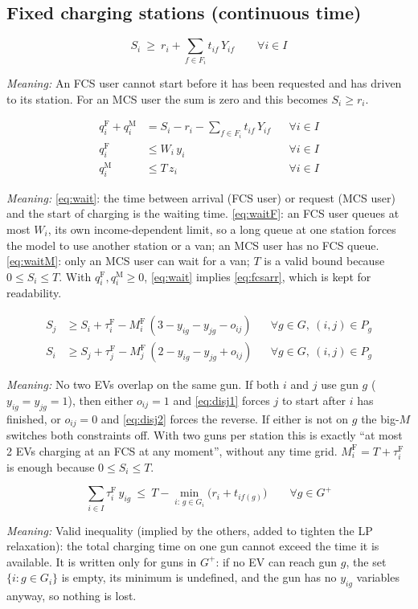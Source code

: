 \documentclass[12pt,a4paper]{article}
\newcommand{\mdesc}[1]{\par{\textit{Meaning:} #1}\par}
\begin{document}
\subsection{Fixed charging stations (continuous time)}
\begin{equation}
S_i\ \ge\ r_i+\sum_{f\in F_i}t_{if}\,Y_{if}\qquad\forall i\in I \label{eq:fcsarr}
\end{equation}
\mdesc{An FCS user cannot start before it has been requested and has driven to its station. For an MCS user the sum is zero and this becomes $S_i\ge r_i$.}

\begin{align}
q^{\mathrm F}_i+q^{\mathrm M}_i &= S_i-r_i-\sum_{f\in F_i}t_{if}\,Y_{if} && \forall i\in I \label{eq:wait}\\
q^{\mathrm F}_i &\le W_i\,y_i && \forall i\in I \label{eq:waitF}\\
q^{\mathrm M}_i &\le T\,z_i && \forall i\in I \label{eq:waitM}
\end{align}
\mdesc{\eqref{eq:wait}: the time between arrival (FCS user) or request (MCS user) and the start of charging is the waiting time. \eqref{eq:waitF}: an FCS user queues at most $W_i$, its own income-dependent limit, so a long queue at one station forces the model to use another station or a van; an MCS user has no FCS queue. \eqref{eq:waitM}: only an MCS user can wait for a van; $T$ is a valid bound because $0\le S_i\le T$. With $q^{\mathrm F}_i,q^{\mathrm M}_i\ge0$, \eqref{eq:wait} implies \eqref{eq:fcsarr}, which is kept for readability.}

\begin{align}
S_j &\ge S_i+\tau^{\mathrm F}_i-M^{\mathrm F}_i\,(3-y_{ig}-y_{jg}-o_{ij}) && \forall g\in G,\ (i,j)\in P_g \label{eq:disj1}\\
S_i &\ge S_j+\tau^{\mathrm F}_j-M^{\mathrm F}_j\,(2-y_{ig}-y_{jg}+o_{ij}) && \forall g\in G,\ (i,j)\in P_g \label{eq:disj2}
\end{align}
\mdesc{No two EVs overlap on the same gun. If both $i$ and $j$ use gun $g$ ($y_{ig}=y_{jg}=1$), then either $o_{ij}=1$ and \eqref{eq:disj1} forces $j$ to start after $i$ has finished, or $o_{ij}=0$ and \eqref{eq:disj2} forces the reverse. If either is not on $g$ the big-$M$ switches both constraints off. With two guns per station this is exactly ``at most 2 EVs charging at an FCS at any moment'', without any time grid. $M^{\mathrm F}_i=T+\tau^{\mathrm F}_i$ is enough because $0\le S_i\le T$.}

\begin{equation}
\sum_{i\in I}\tau^{\mathrm F}_i\,y_{ig}\ \le\ T-\min_{i:\,g\in G_i}\Big(r_i+t_{if(g)}\Big)\qquad\forall g\in G^{+} \label{eq:gunload}
\end{equation}
\mdesc{Valid inequality (implied by the others, added to tighten the LP relaxation): the total charging time on one gun cannot exceed the time it is available. It is written only for guns in $G^{+}$: if no EV can reach gun $g$, the set $\{i: g\in G_i\}$ is empty, its minimum is undefined, and the gun has no $y_{ig}$ variables anyway, so nothing is lost.}
\end{document}
